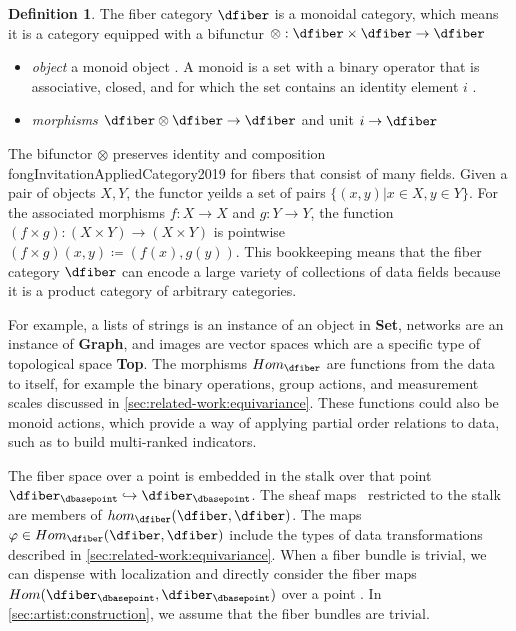 \documentclass[10pt,journal,compsoc]{IEEEtran}
\theoremstyle{definition}
\newtheorem{definition}{Definition}[section]
\theoremstyle{remark}
\begin{document}
\begin{definition} 
  \label{def:category:F} The fiber category $\mathcal{\dfiber}$ is a monoidal category\cite{milewskiCategoryTheoryProgrammers}, which means it is a category equipped with a bifunctur $\otimes: \mathcal{\dfiber} \times \mathcal{\dfiber} \rightarrow \mathcal{\dfiber}$
  \begin{itemize}
    \item \textit{object} a monoid object \dfiber. A monoid is a set with a binary operator that is associative, closed, and for which the set contains an identity element $i$ \cite{nlan:monoid}.
    \item \textit{morphisms} $\dfiber \otimes \dfiber \rightarrow \dfiber$ and unit $i \rightarrow \dfiber$
  \end{itemize}
\end{definition}
The bifunctor $\otimes$ preserves identity and composition {fongInvitationAppliedCategory2019} for fibers that consist of many fields. Given a pair of objects $X, Y$, the functor yeilds a set of pairs $\{(x,y) | x \in X, y \in Y\}$. For the associated morphisms $f: X\rightarrow X$ and $g: Y\rightarrow Y$, the function $(f\times g): (X\times Y) \rightarrow (X \times Y)$ is pointwise $(f\times g)(x, y)\coloneqq (f(x), g(y))$.  This bookkeeping means that the fiber category $\mathcal{\dfiber}$ can encode a large variety of collections of data fields because it is a product category of arbitrary categories. 

For example, a lists of strings is an instance of an object in \textbf{Set}, networks are an instance of \textbf{Graph}, and images are vector spaces which are a specific type of topological space \textbf{Top}.  The morphisms $Hom_{\mathcal{\dfiber}}$ are functions from the data to itself, for example the binary operations, group actions, and measurement scales discussed in \autoref{sec:related-work:equivariance}. These functions could also be monoid actions\cite{barrCategoryTheoryComputing}, which provide a way of applying partial order relations to data\cite{fongInvitationAppliedCategory2019}, such as to build multi-ranked indicators\cite{bruggemannRankingPrioritizationMultiindicator2011}.

The fiber space over a point is embedded in the stalk over that point $\dfiber_{\dbasepoint}\hookrightarrow \mathscr{\dfiber}_{\dbasepoint}$. The sheaf maps \dfunc\ restricted to the stalk are members of $hom_{\mathcal{\dfiber}}(\dfiber,\dfiber)$. The maps $\varphi \in Hom_{\mathcal{\dfiber}}(\dfiber,\dfiber)$ include the types of data transformations described in \autoref{sec:related-work:equivariance}. When a fiber bundle is trivial, we can dispense with localization and directly consider the fiber maps $Hom(\dfiber_{\dbasepoint}, \dfiber_{\dbasepoint})$ over a point \dbasepoint. In \autoref{sec:artist:construction}, we assume that the fiber bundles are trivial.
\end{document}
